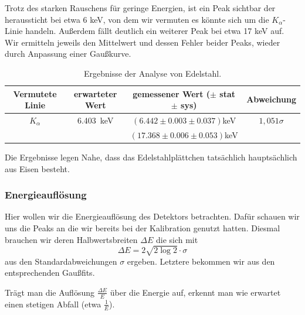 \documentclass[a4paper,14pt]{article}
\begin{document}
Trotz des starken Rauschens für geringe Energien, ist ein Peak sichtbar der heraussticht bei etwa 6 keV, von dem wir vermuten es könnte sich um die $K_\alpha$-Linie handeln. Außerdem fällt deutlich ein weiterer Peak bei etwa 17 keV auf. Wir ermitteln jeweils den Mittelwert und dessen Fehler beider Peaks, wieder durch Anpassung einer Gaußkurve.

\begin{table}[H]
	\renewcommand{\arraystretch}{1.5}
	\centering
	\begin{tabular}{|c|c|c|c|}
		\hline
		Vermutete Linie & erwarteter Wert & gemessener Wert ($\pm$ stat $\pm$ sys) & Abweichung \\
		\hline
		$K_\alpha$ & \SI{6.403}{keV} & $(6.442 \pm 0.003 \pm 0.037)$keV & $1,051\sigma$ \\
		\cline{1-4}
		 & & $(17.368 \pm 0.006 \pm 0.053)$keV & \\
		\hline
	\end{tabular}
	\caption{Ergebnisse der Analyse von Edelstahl.}
	\label{tab:am_fe_mean}
\end{table}

Die Ergebnisse legen Nahe, dass das Edelstahlplättchen tatsächlich hauptsächlich aus Eisen besteht.

\subsubsection{Energieauflösung}
Hier wollen wir die Energieauflösung des Detektors betrachten. Dafür schauen wir uns die Peaks an die wir bereits bei der Kalibration genutzt hatten. Diesmal brauchen wir deren Halbwertsbreiten $\Delta E$ die sich mit
\begin{equation}
	\Delta E = 2 \sqrt{2 \log2} \cdot \sigma
\end{equation}
aus den Standardabweichungen $\sigma$ ergeben. Letztere bekommen wir aus den entsprechenden Gaußfits.

Trägt man die Auflösung $\frac{\Delta E}{E}$ über die Energie auf, erkennt man wie erwartet einen stetigen Abfall (etwa $\frac{1}{E}$).
\end{document}
